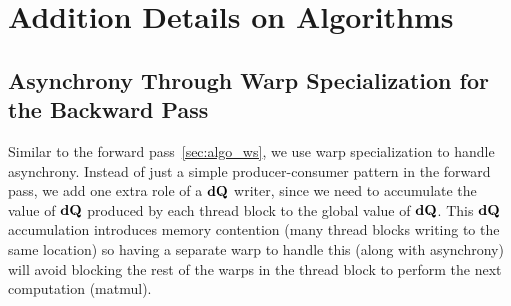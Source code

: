 \section{Addition Details on Algorithms}

\subsection{Asynchrony Through Warp Specialization for the Backward Pass}
\label{sec:algo_ws_bwd}

Similar to the forward pass~\cref{sec:algo_ws}, we use warp specialization to
handle asynchrony.
Instead of just a simple producer-consumer pattern in the forward pass, we add
one extra role of a $\mathbf{dQ}$ writer, since we need to accumulate the value of $\mathbf{dQ}$
produced by each thread block to the global value of $\mathbf{dQ}$.
This $\mathbf{dQ}$ accumulation introduces memory contention (many thread blocks writing to the same
location) so having a separate warp to handle this (along with asynchrony) will
avoid blocking the rest of the warps in the thread block to perform the next
computation (matmul).

